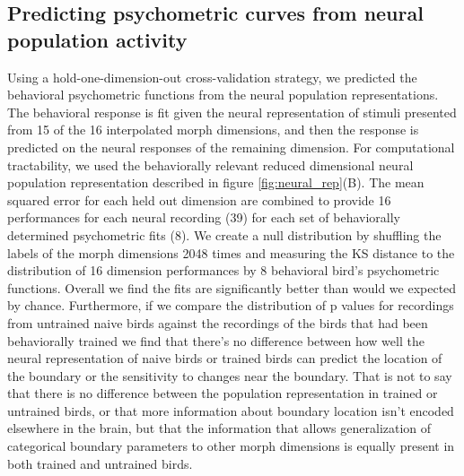 \subsection{Predicting psychometric curves from neural population activity}


Using a hold-one-dimension-out cross-validation strategy, we predicted the behavioral psychometric functions from the neural population representations. The behavioral response is fit given the neural representation of stimuli presented from 15 of the 16 interpolated morph dimensions, and then the response is predicted on the neural responses of the remaining dimension. For computational tractability, we used the behaviorally relevant reduced dimensional neural population representation described in figure \ref{fig:neural_rep}(B). The mean squared error for each held out dimension are combined to provide 16 performances for each neural recording (39) for each set of behaviorally determined psychometric fits (8). We create a null distribution by shuffling the labels of the morph dimensions 2048 times and measuring the KS distance to the distribution of 16 dimension performances by 8 behavioral bird's psychometric functions. Overall we find the fits are significantly better than would we expected by chance. Furthermore, if we compare the distribution of p values for recordings from untrained naive birds against the recordings of the birds that had been behaviorally trained we find that there's no difference between how well the neural representation of naive birds or trained birds can predict the location of the boundary or the sensitivity to changes near the boundary. That is not to say that there is no difference between the population representation in trained or untrained birds, or that more information about boundary location isn't encoded elsewhere in the brain, but that the information that allows generalization of categorical boundary parameters to other morph dimensions is equally present in both trained and untrained birds.
